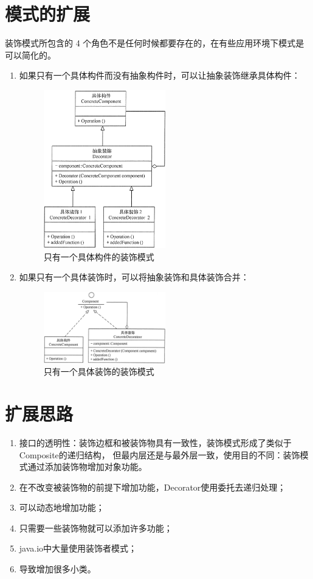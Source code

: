 \section{模式的扩展}
装饰模式所包含的 4 个角色不是任何时候都要存在的，在有些应用环境下模式是可以简化的。
\begin{enumerate}
	\item 如果只有一个具体构件而没有抽象构件时，可以让抽象装饰继承具体构件：
	\begin{figure}[!h]
		\centering
		\includegraphics[width=0.5\textwidth]{image/12-2}
		\caption{只有一个具体构件的装饰模式}
	\end{figure}
	\item 如果只有一个具体装饰时，可以将抽象装饰和具体装饰合并：
	\begin{figure}[!h]
		\centering
		\includegraphics[width=0.5\textwidth]{image/12-3}
		\caption{只有一个具体装饰的装饰模式}
	\end{figure}
\end{enumerate}
\section{扩展思路}
\begin{enumerate}
	\item 接口的透明性：装饰边框和被装饰物具有一致性，装饰模式形成了类似于Composite的递归结构，
	但最内层还是与最外层一致，使用目的不同：装饰模式通过添加装饰物增加对象功能。
	\item 在不改变被装饰物的前提下增加功能，Decorator使用委托去递归处理；
	\item 可以动态地增加功能；
	\item 只需要一些装饰物就可以添加许多功能；
	\item java.io中大量使用装饰者模式；
	\item 导致增加很多小类。
\end{enumerate}
